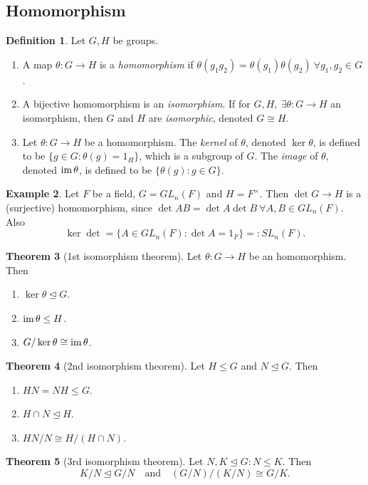 \documentclass[a4paper]{article}
\newcommand{\im}{\text{im\,}}
\theoremstyle{definition}
\newtheorem{defn}{Definition}[subsection]
\newtheorem{thm}[defn]{Theorem}
\newtheorem{example}[defn]{Example}
\begin{document}
\subsection{Homomorphism}
\begin{defn}
Let $G,H$ be groups.
\begin{enumerate}
\item A map $\theta:G\rightarrow H$ is a \textit{homomorphism} if $\theta(g_1g_2)=\theta(g_1)\theta(g_2) \ \forall g_1,g_2\in G$.
\item A bijective homomorphism is an \textit{isomorphism}. If for $G,H,\ \exists\theta:G\rightarrow H$ an isomorphism, then $G$ and $H$ are \textit{isomorphic}, denoted $G\cong H$.
\item Let $\theta:G\rightarrow H$ be a homomorphism. The \textit{kernel} of $\theta$, denoted $\ker \theta$, is defined to be $\{g\in G:\theta (g)=1_H\}$, which is a subgroup of $G$. The \textit{image} of $\theta$, denoted $\im \theta$, is defined to be $\{\theta(g):g\in G\}$.
\end{enumerate}
\end{defn}
\begin{example}
Let $F$ be a field, $G=GL_n(F)$ and $H=F^\times$. Then $\det G\rightarrow H$ is a (surjective) homomorphism, since $\det AB=\det A\det B \ \forall A,B\in GL_n(F)$. Also
\[
\ker \det = \{A\in GL_n(F):\det A=1_F\}=: SL_n(F).
\]
\end{example}

\begin{thm}[1st isomorphism theorem]
Let $\theta:G\rightarrow H$ be an homomorphism. Then
\begin{enumerate}
\item $\ker\theta\unlhd G$.
\item $\im \theta\leq H$.
\item $G/\ker\theta\cong\im\theta$.
\end{enumerate}
\end{thm}

\begin{thm}[2nd isomorphism theorem]
\label{thm:2ndiso}
Let $H\leq G$ and $N\unlhd G$. Then
\begin{enumerate}
\item $HN=NH\leq G$.
\item $H\cap N\unlhd H$.
\item $HN/N\cong H/(H\cap N)$.
\end{enumerate}
\end{thm}

\begin{thm}[3rd isomorphism theorem]
\label{thm:3rdiso}
Let $N,K\unlhd G : N\leq K$. Then
\[
K/N \unlhd G/N \quad \text{and} \quad (G/N)/(K/N)\cong G/K.
\]
\end{thm}
\end{document}
